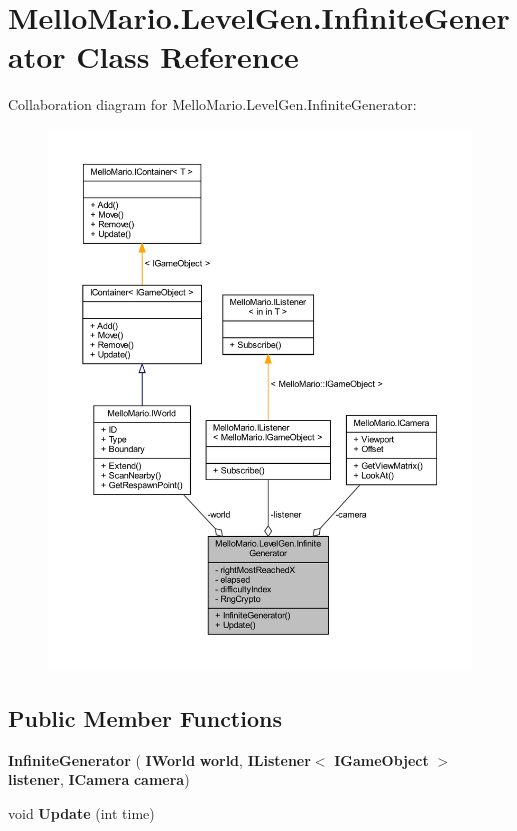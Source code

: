\section{Mello\+Mario.\+Level\+Gen.\+Infinite\+Generator Class Reference}
\label{classMelloMario_1_1LevelGen_1_1InfiniteGenerator}


Collaboration diagram for Mello\+Mario.\+Level\+Gen.\+Infinite\+Generator\+:
\nopagebreak
\begin{figure}[H]
\begin{center}
\leavevmode
\includegraphics[width=350pt]{classMelloMario_1_1LevelGen_1_1InfiniteGenerator__coll__graph}
\end{center}
\end{figure}
\subsection*{Public Member Functions}
\begin{DoxyCompactItemize}
\item 
\textbf{ Infinite\+Generator} (\textbf{ I\+World} \textbf{ world}, \textbf{ I\+Listener}$<$ \textbf{ I\+Game\+Object} $>$ \textbf{ listener}, \textbf{ I\+Camera} \textbf{ camera})
\item 
void \textbf{ Update} (int time)
\end{DoxyCompactItemize}
